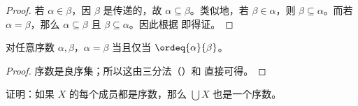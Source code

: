\documentclass[../../../include/open-logic-section]{subfiles}
\begin{document}
\begin{proof}
若 $\alpha \in \beta$，因 $\beta$ 是传递的，故 $\alpha \subseteq \beta$。类似地，若 $\beta \in \alpha$，则 $\beta \subseteq \alpha$。而若 $\alpha = \beta$，那么 $\alpha \subseteq \beta$ 且 $\beta \subseteq \alpha$。因此根据  即得证。
\end{proof}

\begin{prop}
对任意序数 $\alpha, \beta$，$\alpha = \beta$ 当且仅当 $\ordeq{\alpha}{\beta}$。
\end{prop}

\begin{proof}
序数是良序集；所以这由三分法（）和  直接可得。
\end{proof}

\begin{prob}
证明：如果 $X$ 的每个成员都是序数，那么 $\bigcup X$ 也是一个序数。
\end{prob}
\end{document}
